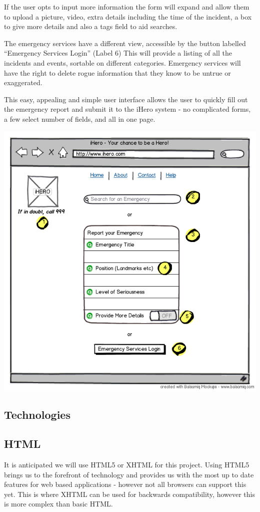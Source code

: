 \documentclass{sig-alt-release2}
\begin{document}
If the user opts to input more information the form will expand and allow them to upload a picture, video, extra details including the time of the incident, a box to give more details and also a tags field to aid searches.

The emergency services have a different view, accessible by the button labelled “Emergency Services Login” (Label 6) This will provide a listing of all the incidents and events, sortable on different categories. Emergency services will have the right to delete rogue information that they know to be untrue or exaggerated.

This easy, appealing and simple user interface allows the user to quickly fill out the emergency report and submit it to the iHero system - no complicated forms, a few select number of fields, and all in one page.

\begin{center}
\includegraphics[scale=0.4]{img/1.png}
\end{center}

\subsection{Technologies}

\subsection{HTML}
It is anticipated we will use HTML5 or XHTML for this project. Using HTML5 brings us to the forefront of technology and provides us with the most up to date features for web based applications - however not all browsers can support this yet. This is where XHTML can be used for backwards compatibility, however this is more complex than basic HTML.
\end{document}
